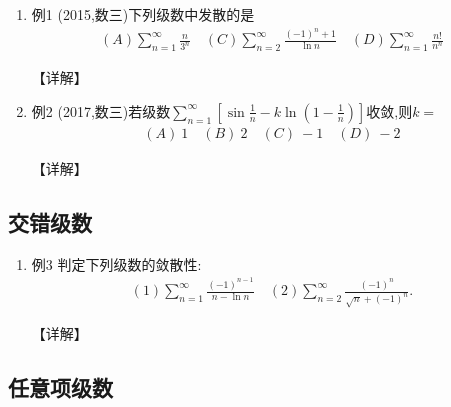 \documentclass[12pt, a4paper, oneside, UTF8]{ctexbook}
\begin{document}
\begin{enumerate}[label=\arabic*.]
    \item 例1 (2015,数三)下列级数中发散的是
    \begin{align*}
        (A)\sum_{n=1}^{\infty}\frac{n}{3^n} \quad (C)\sum_{n=2}^{\infty}\frac{(-1)^n+1}{\ln n} \quad (D)\sum_{n=1}^{\infty}\frac{n!}{n^n}
    \end{align*}
    
    \begin{solution}
    【详解】
    \end{solution}
    
    \item 例2 (2017,数三)若级数$\sum_{n=1}^{\infty}\left[\sin\frac{1}{n}-k\ln\left(1-\frac{1}{n}\right)\right]$收敛,则$k=$
    \begin{align*}
        (A)\ 1 \quad (B)\ 2 \quad (C)\ -1 \quad (D)\ -2
    \end{align*}
    
    \begin{solution}
    【详解】
    \end{solution}
\end{enumerate}

\subsection{交错级数}

\begin{enumerate}[label=\arabic*.,start=3]
    \item 例3 判定下列级数的敛散性:
    \begin{align*}
        (1)\sum_{n=1}^{\infty}\frac{(-1)^{n-1}}{n-\ln n} \quad (2)\sum_{n=2}^{\infty}\frac{(-1)^n}{\sqrt{n}+(-1)^n}.
    \end{align*}
    
    \begin{solution}
    【详解】
    \end{solution}
\end{enumerate}

\subsection{任意项级数}
\end{document}
